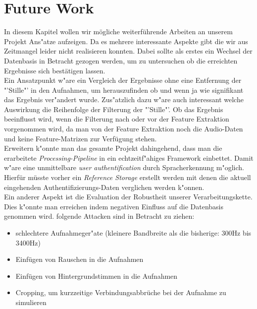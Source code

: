 \section{Future Work}

In diesem Kapitel wollen wir mögliche weiterführende Arbeiten an unserem Projekt  Ans"atze aufzeigen. Da es mehrere interessante Aspekte gibt die wir aus Zeitmangel leider nicht realisieren konnten. 
Dabei sollte als erstes ein Wechsel der Datenbasis in Betracht gezogen werden, um zu untersuchen ob die erreichten Ergebnisse sich bestätigen lassen.\\


Ein Ansatzpunkt w"are ein Vergleich der Ergebnisse ohne eine Entfernung der "'Stille"' in den Aufnahmen, um herauszufinden ob und wenn ja wie signifikant das Ergebnis ver"andert wurde.
Zus"atzlich dazu w"are auch interessant welche Auswirkung die Reihenfolge der Filterung der "'Stille"'. Ob das Ergebnis beeinflusst wird, wenn die Filterung nach oder vor der Feature Extraktion vorgenommen wird, da man von der Feature Extraktion noch die Audio-Daten und keine Feature-Matrizen zur Verfügung stehen.\\


Erweitern k"onnte man das gesamte Projekt dahingehend, dass man die erarbeitete \textit{Processing-Pipeline} in ein echtzeitf"ahiges Framework einbettet. Damit w"are eine unmittelbare \textit{user authentification} durch Spracherkennung m"oglich. Hierfür müsste vorher ein \textit{Reference Storage} erstellt werden mit denen die aktuell eingehenden Authentifizierungs-Daten verglichen werden k"onnen.\\

Ein anderer Aspekt ist die Evaluation der Robustheit unserer Verarbeitungskette. 
Dies k"onnte man erreichen indem negativen Einfluss auf die Datenbasis genommen wird. 
folgende Attacken sind in Betracht zu ziehen:
\begin{itemize}
	\item[\textbullet] schlechtere Aufnahmeger"ate (kleinere Bandbreite als die bisherige: 300Hz bis 3400Hz) 
	\item[\textbullet] Einfügen von Rauschen in die Aufnahmen
	\item[\textbullet] Einfügen von Hintergrundstimmen in die Aufnahmen
	\item[\textbullet] Cropping, um kurzzeitige Verbindungsabbrüche bei der Aufnahme zu simulieren
\end{itemize}